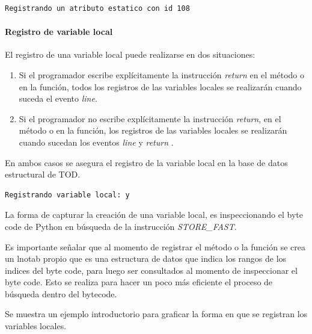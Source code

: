 \documentclass[12pt,legalpaper]{report}
\begin{document}
\begin{singlespace}
\begin{lstlisting}[style=consola,numbers=none]
Registrando un atributo estatico con id 108
\end{lstlisting}
\end{singlespace}


				\paragraph{Registro de variable local\label{registerLocal}}
				
El registro de una variable local puede realizarse en dos situaciones:

\begin{enumerate}
	\item Si el programador escribe explícitamente la instrucción \textit{return} en el método o en la función, todos los registros de las variables locales se realizarán cuando suceda el evento \textit{line}.
	\item Si el programador no escribe explícitamente la instrucción \textit{return}, en el método o en la función, los registros de las variables locales se realizarán cuando sucedan los eventos \textit{line} y \textit{return} \cite{bytecode}.
\end{enumerate}

En ambos casos se asegura el registro de la variable local en la base de datos estructural de TOD.

\begin{singlespace}
\begin{lstlisting}[style=Python]
Registrando variable local: y
\end{lstlisting}
\end{singlespace}

La forma de capturar la creación de una variable local, es inspeccionando el byte code de Python en búsqueda de la instrucción \textit{STORE\_FAST}. \cite{bytecode}

Es importante señalar que al momento de registrar el método o la función se crea un lnotab \cite{lnotab} propio que es una estructura de datos que indica los rangos de los indices del byte code, para luego ser consultados al momento de inspeccionar el byte code.  Esto se realiza para hacer un poco más eficiente el proceso de búsqueda dentro del bytecode.

Se muestra un ejemplo introductorio para graficar la forma en que se registran los variables locales.
\end{document}
